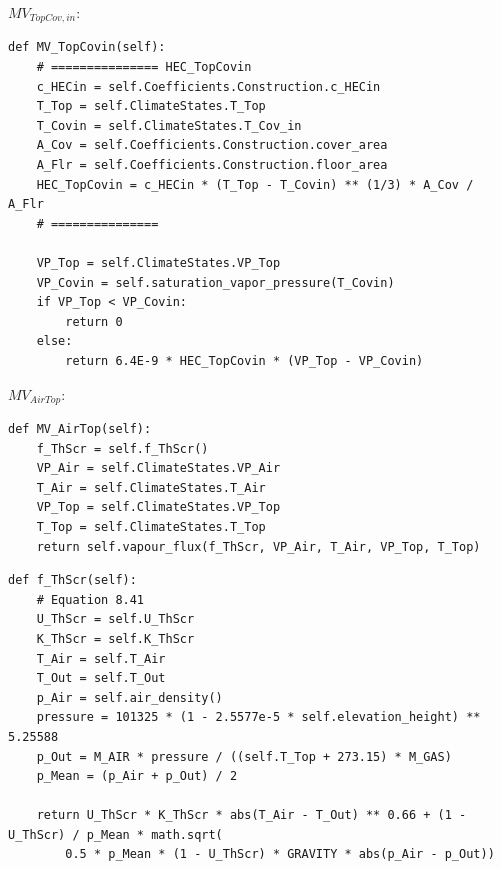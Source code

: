\documentclass[a4paper]{article}
\numberwithin{equation}{section}
\begin{document}
\( MV_{TopCov,in} \):
\begin{mdframed}[leftline=false,rightline=false,backgroundcolor=magenta!10,nobreak=true]
  \begin{verbatim}
def MV_TopCovin(self):
    # =============== HEC_TopCovin
    c_HECin = self.Coefficients.Construction.c_HECin
    T_Top = self.ClimateStates.T_Top
    T_Covin = self.ClimateStates.T_Cov_in
    A_Cov = self.Coefficients.Construction.cover_area
    A_Flr = self.Coefficients.Construction.floor_area
    HEC_TopCovin = c_HECin * (T_Top - T_Covin) ** (1/3) * A_Cov / A_Flr
    # ===============

    VP_Top = self.ClimateStates.VP_Top
    VP_Covin = self.saturation_vapor_pressure(T_Covin)
    if VP_Top < VP_Covin:
        return 0
    else:
        return 6.4E-9 * HEC_TopCovin * (VP_Top - VP_Covin)
  \end{verbatim}
\end{mdframed}

\( MV_{AirTop} \):
\begin{mdframed}[leftline=false,rightline=false,backgroundcolor=magenta!10,nobreak=true]
  \begin{verbatim}
def MV_AirTop(self):
    f_ThScr = self.f_ThScr()
    VP_Air = self.ClimateStates.VP_Air
    T_Air = self.ClimateStates.T_Air
    VP_Top = self.ClimateStates.VP_Top
    T_Top = self.ClimateStates.T_Top
    return self.vapour_flux(f_ThScr, VP_Air, T_Air, VP_Top, T_Top)
  \end{verbatim}
\end{mdframed}
\begin{mdframed}[leftline=false,rightline=false,backgroundcolor=magenta!10,nobreak=true]
  \begin{verbatim}
def f_ThScr(self):
    # Equation 8.41
    U_ThScr = self.U_ThScr
    K_ThScr = self.K_ThScr
    T_Air = self.T_Air
    T_Out = self.T_Out
    p_Air = self.air_density()
    pressure = 101325 * (1 - 2.5577e-5 * self.elevation_height) ** 5.25588
    p_Out = M_AIR * pressure / ((self.T_Top + 273.15) * M_GAS)
    p_Mean = (p_Air + p_Out) / 2

    return U_ThScr * K_ThScr * abs(T_Air - T_Out) ** 0.66 + (1 - U_ThScr) / p_Mean * math.sqrt(
        0.5 * p_Mean * (1 - U_ThScr) * GRAVITY * abs(p_Air - p_Out))
  \end{verbatim}
\end{mdframed}
\end{document}
